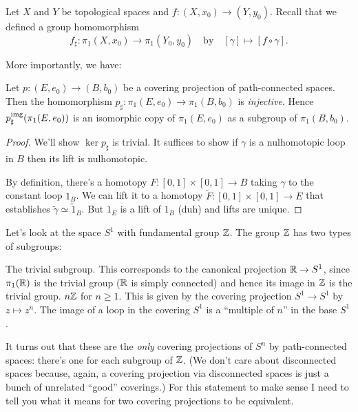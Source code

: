 Let $X$ and $Y$ be topological spaces and $f \colon (X, x_0) \to (Y, y_0)$.
Recall that we defined a group homomorphism
\[ f_\sharp \colon \pi_1(X, x_0) \to \pi_1(Y_0, y_0)
	\quad\text{by}\quad
	[\gamma] \mapsto [f \circ \gamma]. \]

More importantly, we have:
\begin{proposition}
	Let $p \colon (E,e_0) \to (B,b_0)$ be a covering projection of path-connected spaces.
	Then the homomorphism $p_\sharp \colon \pi_1(E, e_0) \to \pi_1(B, b_0)$ is \emph{injective}.
	Hence $p_\sharp ^{\text{img}}(\pi_1(E, e_0))$ is an isomorphic copy of $\pi_1(E, e_0)$
	as a subgroup of $\pi_1(B, b_0)$.
\end{proposition}
\begin{proof}
	We'll show $\ker p_\sharp$ is trivial.
	It suffices to show if $\gamma$ is a nulhomotopic loop in $B$
	then its lift is nulhomotopic.

	By definition, there's a homotopy $F \colon [0,1] \times [0,1] \to B$
	taking $\gamma$ to the constant loop $1_B$.
	We can lift it to a homotopy $\tilde F \colon [0,1] \times [0,1] \to E$
	that establishes $\tilde\gamma \simeq \tilde 1_B$.
	But $1_E$ is a lift of $1_B$ (duh) and lifts are unique.
\end{proof}

\begin{example}[Subgroups of $\ZZ$]
	Let's look at the space $S^1$ with fundamental group $\ZZ$.
	The group $\ZZ$ has two types of subgroups:
	\begin{itemize}
		\ii The trivial subgroup.
		This corresponds to the canonical projection $\mathbb R \to S^1$,
		since $\pi_1(\mathbb R)$ is the trivial group ($\mathbb R$ is simply connected)
		and hence its image in $\ZZ$ is the trivial group.
		\ii $n\mathbb Z$ for $n \ge 1$.
		This is given by the covering projection $S^1 \to S^1$
		by $z \mapsto z^n$.
		The image of a loop in the covering $S^1$ is a ``multiple of $n$''
		in the base $S^1$.
	\end{itemize}
\end{example}

It turns out that these are the \emph{only} covering projections of $S^n$ by path-connected spaces: there's one for each subgroup of $\ZZ$.
(We don't care about disconnected spaces because, again, a covering projection
via disconnected spaces is just a bunch of unrelated ``good'' coverings.)
For this statement to make sense I need to tell you what it means for
two covering projections to be equivalent.

